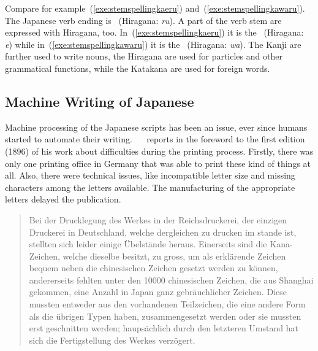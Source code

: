 Compare for example~(\ref{exe:stemspellingkaeru}) 
and~(\ref{exe:stemspellingkawaru}). 
The Japanese verb ending is 
~(Hiragana: \emph{ru}). A part of the verb stem are expressed with
Hiragana, too. In~(\ref{exe:stemspellingkaeru}) it is the 
~(Hiragana: \emph{e}) while in~(\ref{exe:stemspellingkawaru}) it is the 
~(Hiragana: \emph{wa}).
The Kanji are further used to write nouns, the Hiragana are used for particles 
and other grammatical functions, while the Katakana are used for foreign words.


\subsection{Machine Writing of Japanese}
\label{sec:machinewritingofjapanese}

Machine processing of the Japanese scripts has been an issue, ever since humans
started to automate their writing. 
~~\citeyear{Lange1922} reports in the foreword to the 
first edition (1896) of his work about difficulties during the printing process. 
Firstly, there was only one printing office in Germany that was able to print 
these kind of things at all. Also, there were technical issues, 
like incompatible letter size and missing characters among the letters 
available. The manufacturing of the appropriate letters delayed the publication.
\begin{quote}
Bei der Drucklegung des Werkes in der Reichsdruckerei, der einzigen Druckerei 
in Deutschland, welche dergleichen zu drucken im stande ist, stellten sich 
leider einige Übelstände heraus. Einerseits sind die Kana-Zeichen, 
welche dieselbe besitzt, zu gross, um als erklärende Zeichen bequem neben die 
chinesischen Zeichen gesetzt werden zu können, andererseits fehlten unter den 
10000 chinesischen Zeichen, die aus Shanghai gekommen, eine Anzahl in Japan 
ganz gebräuchlicher Zeichen. 
Diese mussten entweder aus den vorhandenen Teilzeichen,
die eine andere Form als die übrigen Typen haben, zusammengesetzt werden oder 
sie mussten erst geschnitten werden; 
haupsächlich durch den letzteren Umstand hat sich die Fertigstellung des Werkes 
verzögert.
\end{quote}

